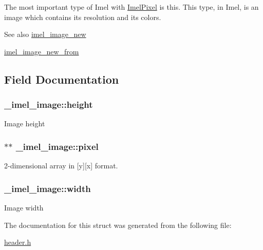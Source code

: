 The most important type of Imel with \hyperlink{header_8h_add7dd9f8c093208bc4fd135a22a670ba}{Imel\+Pixel} is this. This type, in Imel, is an image which contains its resolution and its colors.

\begin{DoxySeeAlso}{See also}
\hyperlink{image_8c_af3a4abcb52f5611781065536fda0f97e}{imel\+\_\+image\+\_\+new} 

\hyperlink{image__new__from_8c_a43a15b507cf100b80bc07ce92a48adc7}{imel\+\_\+image\+\_\+new\+\_\+from} 
\end{DoxySeeAlso}


\subsection{Field Documentation}
\subsubsection[{\texorpdfstring{height}{height}}]{ \+\_\+imel\+\_\+image\+::height}\hypertarget{struct__imel__image_aac8aaaa7bd52f888126f05cf87d46531}{}\label{struct__imel__image_aac8aaaa7bd52f888126f05cf87d46531}
Image height 
\subsubsection[{\texorpdfstring{pixel}{pixel}}]{$\ast$$\ast$ \+\_\+imel\+\_\+image\+::pixel}\hypertarget{struct__imel__image_a7a156b8fc30a034d713afb77d198f320}{}\label{struct__imel__image_a7a156b8fc30a034d713afb77d198f320}
2-\/dimensional array in \mbox{[}y\mbox{]}\mbox{[}x\mbox{]} format. 
\subsubsection[{\texorpdfstring{width}{width}}]{ \+\_\+imel\+\_\+image\+::width}\hypertarget{struct__imel__image_a21d117461b6a449755cf1519e6360be5}{}\label{struct__imel__image_a21d117461b6a449755cf1519e6360be5}
Image width 

The documentation for this struct was generated from the following file\+:\begin{DoxyCompactItemize}
\item 
\hyperlink{header_8h}{header.\+h}\end{DoxyCompactItemize}
